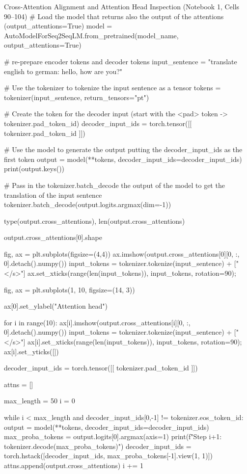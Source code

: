 \documentclass[11pt,a4paper]{article}
\begin{document}
\begin{solutioncode}[label=lst:cross_attention_inspection]{Cross-Attention Alignment and Attention Head Inspection (Notebook 1, Cells 90--104)}
# Load the model that returns also the output of the attentions (output_attentions=True)
model = AutoModelForSeq2SeqLM.from_pretrained(model_name, output_attentions=True)

# re-prepare encoder tokens and decoder tokens
input_sentence = "translate english to german: hello, how are you?"

# Use the tokenizer to tokenize the input sentence as a tensor
tokens = tokenizer(input_sentence, return_tensors="pt")

# Create the token for the decoder input (start with the <pad> token -> tokenizer.pad_token_id)
decoder_input_ids = torch.tensor([[ tokenizer.pad_token_id ]])

# Use the model to generate the output putting the decoder_input_ids as the first token
output = model(**tokens, decoder_input_ids=decoder_input_ids)
print(output.keys())

# Pass in the tokenizer.batch_decode the output of the model to get the translation of the input sentence
tokenizer.batch_decode(output.logits.argmax(dim=-1))

type(output.cross_attentions), len(output.cross_attentions)

output.cross_attentions[0].shape

fig, ax = plt.subplots(figsize=(4,4))
ax.imshow(output.cross_attentions[0][0, :, 0].detach().numpy())
input_tokens = tokenizer.tokenize(input_sentence) + ["</s>"]
ax.set_xticks(range(len(input_tokens)), input_tokens, rotation=90);

fig, ax = plt.subplots(1, 10, figsize=(14, 3))

ax[0].set_ylabel("Attention head")

for i in range(10):
    ax[i].imshow(output.cross_attentions[i][0, :, 0].detach().numpy())
    input_tokens = tokenizer.tokenize(input_sentence) + ["</s>"]
    ax[i].set_xticks(range(len(input_tokens)), input_tokens, rotation=90);
    ax[i].set_yticks([])

decoder_input_ids = torch.tensor([[ tokenizer.pad_token_id ]])

attns = []

max_length = 50
i = 0

while i < max_length and decoder_input_ids[0,-1] != tokenizer.eos_token_id:
    output = model(**tokens, decoder_input_ids=decoder_input_ids)
    max_proba_tokens = output.logits[0].argmax(axis=1)
    print(f"Step {i+1}: {tokenizer.decode(max_proba_tokens)}")
    decoder_input_ids = torch.hstack([decoder_input_ids, max_proba_tokens[-1].view(1, 1)])
    attns.append(output.cross_attentions)
    i += 1


\end{solutioncode}
\end{document}

